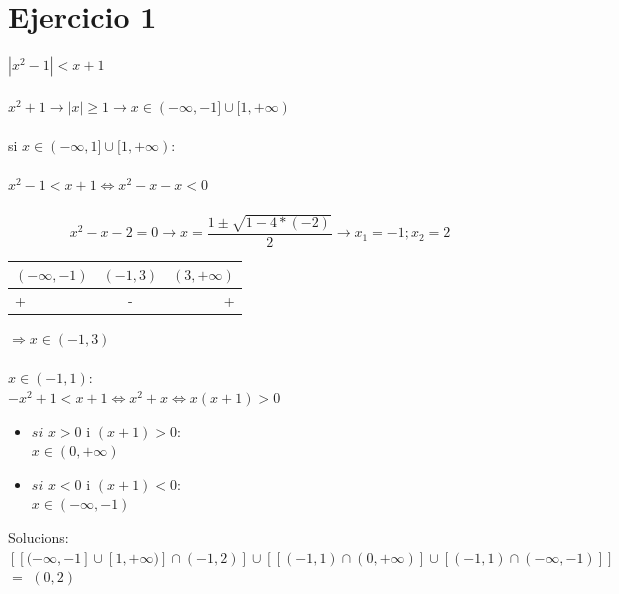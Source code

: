 \section{Ejercicio 1}

$|x^2-1| < x + 1$\\
\\
$x^2+1 \longrightarrow |x| \geq 1 \longrightarrow x\in(-\infty,-1]\cup[1,+\infty)$\\
\\
si $x\in(-\infty,1]\cup[1,+\infty):$\\
\\
$x^2-1 < x+1 \Leftrightarrow x^2-x-x < 0$\\
\\
\begin{equation}
x^2-x-2 = 0 \longrightarrow x = \frac{1 \pm \sqrt{1 - 4*(-2)}}
{2} \longrightarrow x_1 = -1; x_2 = 2
\end{equation}

\begin{tabular}{|l|c|r|}

\hline

$(-\infty,-1)$ & $(-1,3)$ & $(3,+\infty)$ \\

\hline

+ & - & + \\

\hline

\end{tabular}
$\Rightarrow x \in (-1,3)$\\
\\
$x \in (-1,1):$\\
$-x^2 + 1 < x + 1 \Leftrightarrow x^2 + x \Leftrightarrow x(x+1) > 0$
\begin{itemize} %

\item $si$ $x > 0$ i $(x+1) > 0:$\\

$x\in(0,+\infty)$

\item $si$ $x < 0$ i $(x+1) < 0:$\\

$x\in(-\infty,-1)$\\

\end{itemize}

Solucions: $[[(-\infty,-1]\cup[1,+\infty)]\cap(-1,2)]\cup[[(-1,1)\cap(0,+\infty)]\cup[(-1,1)\cap(-\infty,-1)]]$ $=$ $(0,2)$